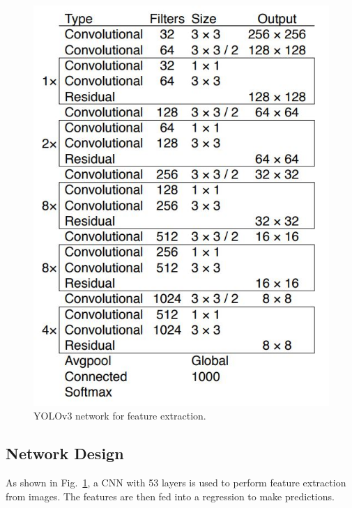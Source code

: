 \documentclass[letterpaper]{article} %
\begin{document}
\begin{figure}[ht]
\hspace{-6mm}
\centering
\includegraphics[width=0.85\linewidth,height = 1\linewidth]{Figure/yolov3_structure.JPG}
\caption{\footnotesize{YOLOv3 network for feature extraction.}}
\label{fig:network}
\vspace{-2mm}
\end{figure}

\subsection{Network Design}
As shown in Fig.~\ref{fig:network}, a CNN with 53 layers is used to perform feature extraction from images. The features are then fed into a regression to make predictions. 
\end{document}
